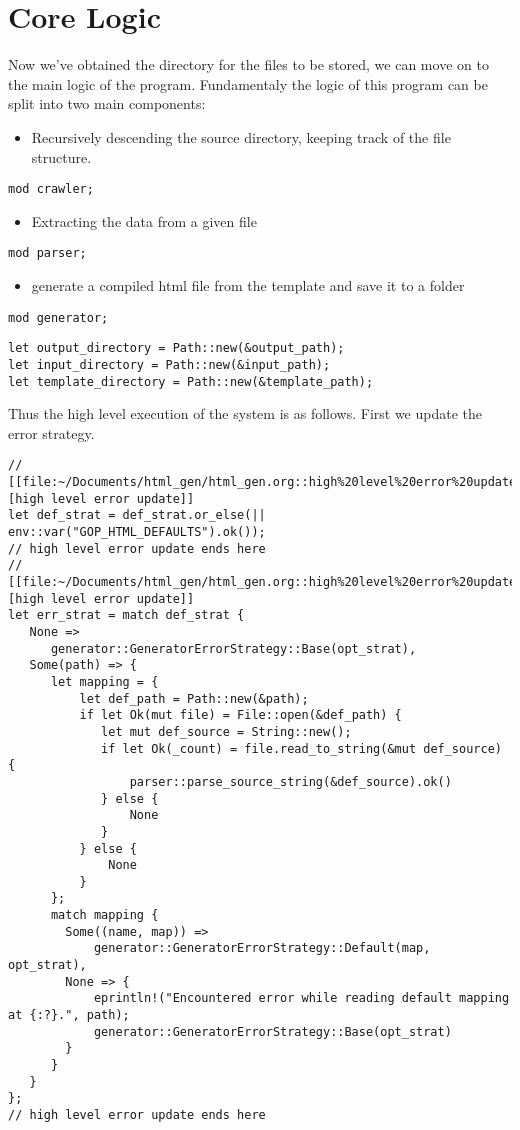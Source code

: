 \documentclass[11pt]{article}
\begin{document}
\section{Core Logic}
\label{sec:orgaaa8178}
Now we've obtained the directory for the files to be stored, we can move on to the main logic of the program.
Fundamentaly the logic of this program can be split into two main components:
\begin{itemize}
\item Recursively descending the source directory, keeping track of the file structure.
\end{itemize}
\begin{verbatim}
mod crawler;
\end{verbatim}
\begin{itemize}
\item Extracting the data from a given file
\end{itemize}
\begin{verbatim}
mod parser;
\end{verbatim}
\begin{itemize}
\item generate a compiled html file from the template and save it to a folder
\end{itemize}
\begin{verbatim}
mod generator;
\end{verbatim}



\begin{verbatim}
let output_directory = Path::new(&output_path);
let input_directory = Path::new(&input_path);
let template_directory = Path::new(&template_path);
\end{verbatim}

Thus the high level execution of the system is as follows.
First we update the error strategy.
\begin{verbatim}
// [[file:~/Documents/html_gen/html_gen.org::high%20level%20error%20update][high level error update]]
let def_strat = def_strat.or_else(|| env::var("GOP_HTML_DEFAULTS").ok());
// high level error update ends here
// [[file:~/Documents/html_gen/html_gen.org::high%20level%20error%20update][high level error update]]
let err_strat = match def_strat {
   None => 
      generator::GeneratorErrorStrategy::Base(opt_strat),
   Some(path) => {
      let mapping = { 
          let def_path = Path::new(&path);
          if let Ok(mut file) = File::open(&def_path) {
             let mut def_source = String::new();
             if let Ok(_count) = file.read_to_string(&mut def_source) {
                 parser::parse_source_string(&def_source).ok()
             } else {
                 None
             }
          } else {
              None
          } 
      };
      match mapping {
        Some((name, map)) => 
            generator::GeneratorErrorStrategy::Default(map, opt_strat), 
        None => {
            eprintln!("Encountered error while reading default mapping at {:?}.", path);
            generator::GeneratorErrorStrategy::Base(opt_strat)
        }
      }
   }
};
// high level error update ends here
\end{verbatim}
\end{document}
